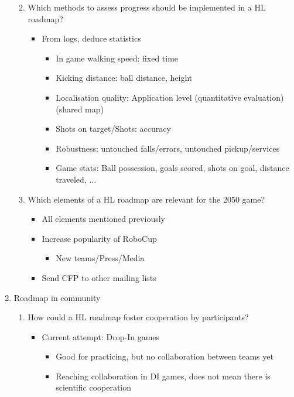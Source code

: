 \documentclass{article}
\begin{document}
\begin{enumerate}
\begin{enumerate}
\begin{itemize}
   \end{itemize}
       \item Which methods to assess progress should be implemented in a HL roadmap?
       \begin{itemize} 
           \item From logs, deduce statistics
           \begin{itemize} 
               \item In game walking speed: fixed time
               \item Kicking distance: ball distance, height
               \item Localisation quality: Application level (quantitative evaluation) (shared map)
               \item Shots on target/Shots: accuracy
               \item Robustness: untouched falls/errors, untouched pickup/services
               \item Game stats: Ball possession, goals scored, shots on goal, distance traveled, ...
   \end{itemize}
   \end{itemize}
       \item Which elements of a HL roadmap are relevant for the 2050 game?
       \begin{itemize} 
           \item All elements mentioned previously
           \item Increase popularity of RoboCup
           \begin{itemize} 
               \item New teams/Press/Media
       \end{itemize}
           \item Send CFP to other mailing lists
\end{itemize}
\end{enumerate}
   \item Roadmap in community
   \begin{enumerate} 
       \item How could a HL roadmap foster cooperation by participants?
       \begin{itemize} 
           \item Current attempt: Drop-In games
           \begin{itemize} 
               \item Good for practicing, but no collaboration between teams yet
               \item Reaching collaboration in DI games, does not mean there is scientific cooperation

\end{itemize}
\end{itemize}
\end{enumerate}
\end{enumerate}
\end{document}
